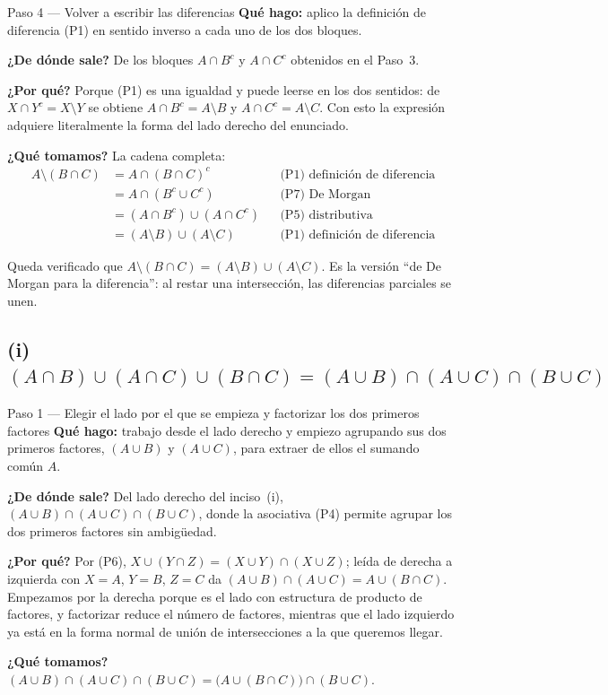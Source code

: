 \documentclass[11pt]{article}
\begin{document}
\begin{paso}{Paso 4 --- Volver a escribir las diferencias}
\textbf{Qué hago:} aplico la definición de diferencia (P1) en sentido inverso a cada uno de los
dos bloques.

\textbf{¿De dónde sale?} De los bloques $A\cap B^{c}$ y $A\cap C^{c}$ obtenidos en el Paso~3.

\textbf{¿Por qué?} Porque (P1) es una igualdad y puede leerse en los dos sentidos: de
$X\cap Y^{c}=X\setminus Y$ se obtiene $A\cap B^{c}=A\setminus B$ y $A\cap C^{c}=A\setminus C$.
Con esto la expresión adquiere literalmente la forma del lado derecho del enunciado.

\textbf{¿Qué tomamos?} La cadena completa:
\begin{align*}
A\setminus(B\cap C)
&=A\cap(B\cap C)^{c} && \text{(P1) definición de diferencia}\\
&=A\cap(B^{c}\cup C^{c}) && \text{(P7) De Morgan}\\
&=(A\cap B^{c})\cup(A\cap C^{c}) && \text{(P5) distributiva}\\
&=(A\setminus B)\cup(A\setminus C) && \text{(P1) definición de diferencia}
\end{align*}
\end{paso}

\begin{resp}
Queda verificado que $A\setminus(B\cap C)=(A\setminus B)\cup(A\setminus C)$. Es la versión ``de
De Morgan para la diferencia'': al restar una intersección, las diferencias parciales se unen.
\end{resp}

\subsection*{(i) \ $(A\cap B)\cup(A\cap C)\cup(B\cap C)=(A\cup B)\cap(A\cup C)\cap(B\cup C)$}

\begin{paso}{Paso 1 --- Elegir el lado por el que se empieza y factorizar los dos primeros factores}
\textbf{Qué hago:} trabajo desde el lado derecho y empiezo agrupando sus dos primeros factores,
$(A\cup B)$ y $(A\cup C)$, para extraer de ellos el sumando común $A$.

\textbf{¿De dónde sale?} Del lado derecho del inciso~(i), $(A\cup B)\cap(A\cup C)\cap(B\cup C)$,
donde la asociativa (P4) permite agrupar los dos primeros factores sin ambigüedad.

\textbf{¿Por qué?} Por (P6), $X\cup(Y\cap Z)=(X\cup Y)\cap(X\cup Z)$; leída de derecha a
izquierda con $X=A$, $Y=B$, $Z=C$ da $(A\cup B)\cap(A\cup C)=A\cup(B\cap C)$. Empezamos por la
derecha porque es el lado con estructura de producto de factores, y factorizar reduce el número
de factores, mientras que el lado izquierdo ya está en la forma normal de unión de
intersecciones a la que queremos llegar.

\textbf{¿Qué tomamos?}
$(A\cup B)\cap(A\cup C)\cap(B\cup C)=\bigl(A\cup(B\cap C)\bigr)\cap(B\cup C)$.
\end{paso}
\end{document}

